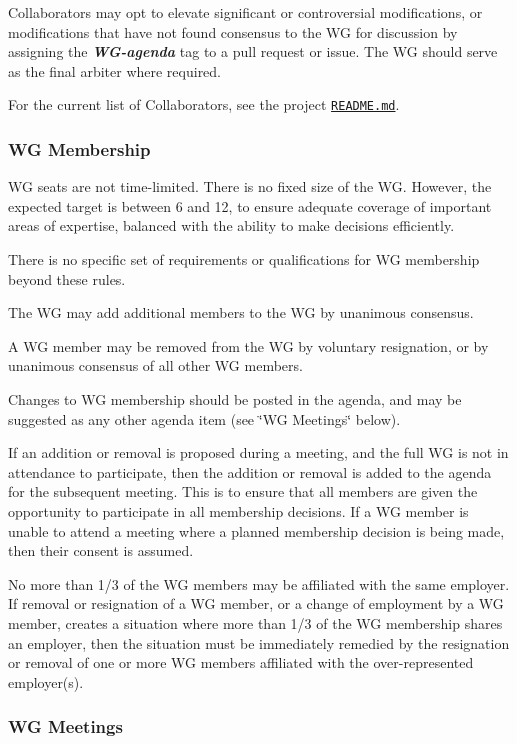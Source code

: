 Collaborators may opt to elevate significant or controversial modifications, or modifications that have not found consensus to the WG for discussion by assigning the {\itshape {\bfseries W\+G-\/agenda}} tag to a pull request or issue. The WG should serve as the final arbiter where required.

For the current list of Collaborators, see the project \href{./README.md#members}{\tt R\+E\+A\+D\+M\+E.\+md}.

\subsubsection*{WG Membership}

WG seats are not time-\/limited. There is no fixed size of the WG. However, the expected target is between 6 and 12, to ensure adequate coverage of important areas of expertise, balanced with the ability to make decisions efficiently.

There is no specific set of requirements or qualifications for WG membership beyond these rules.

The WG may add additional members to the WG by unanimous consensus.

A WG member may be removed from the WG by voluntary resignation, or by unanimous consensus of all other WG members.

Changes to WG membership should be posted in the agenda, and may be suggested as any other agenda item (see \char`\"{}\+W\+G Meetings\char`\"{} below).

If an addition or removal is proposed during a meeting, and the full WG is not in attendance to participate, then the addition or removal is added to the agenda for the subsequent meeting. This is to ensure that all members are given the opportunity to participate in all membership decisions. If a WG member is unable to attend a meeting where a planned membership decision is being made, then their consent is assumed.

No more than 1/3 of the WG members may be affiliated with the same employer. If removal or resignation of a WG member, or a change of employment by a WG member, creates a situation where more than 1/3 of the WG membership shares an employer, then the situation must be immediately remedied by the resignation or removal of one or more WG members affiliated with the over-\/represented employer(s).

\subsubsection*{WG Meetings}

